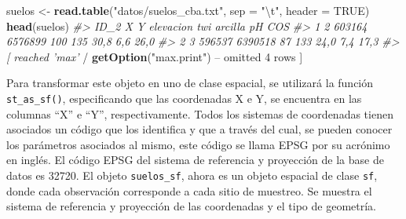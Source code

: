 \documentclass[11pt,b5paper,]{krantz}
\newenvironment{Shaded}{}{}
\newcommand{\KeywordTok}[1]{\textcolor[rgb]{0.00,0.44,0.13}{\textbf{#1}}}
\newcommand{\DataTypeTok}[1]{\textcolor[rgb]{0.56,0.13,0.00}{#1}}
\newcommand{\DecValTok}[1]{\textcolor[rgb]{0.25,0.63,0.44}{#1}}
\newcommand{\CharTok}[1]{\textcolor[rgb]{0.25,0.44,0.63}{#1}}
\newcommand{\StringTok}[1]{\textcolor[rgb]{0.25,0.44,0.63}{#1}}
\newcommand{\CommentTok}[1]{\textcolor[rgb]{0.38,0.63,0.69}{\textit{#1}}}
\newcommand{\OtherTok}[1]{\textcolor[rgb]{0.00,0.44,0.13}{#1}}
\newcommand{\OperatorTok}[1]{\textcolor[rgb]{0.40,0.40,0.40}{#1}}
\newcommand{\NormalTok}[1]{#1}
\begin{document}
\begin{Shaded}
\begin{Highlighting}[]
\NormalTok{suelos <-}\StringTok{ }\KeywordTok{read.table}\NormalTok{(}\StringTok{"datos/suelos_cba.txt"}\NormalTok{, }
                     \DataTypeTok{sep =} \StringTok{"}\CharTok{\textbackslash{}t}\StringTok{"}\NormalTok{, }\DataTypeTok{header =} \OtherTok{TRUE}\NormalTok{)}
\KeywordTok{head}\NormalTok{(suelos)}
\CommentTok{#> ID_2 X Y elevacion twi arcilla pH COS}
\CommentTok{#> 1 2 603164 6576899 100 135 30,8 6,6 26,0}
\CommentTok{#> 2 3 596537 6390518 87 133 24,0 7,4 17,3}
\CommentTok{#> [ reached 'max'}
    \OperatorTok{/}\StringTok{ }\KeywordTok{getOption}\NormalTok{(}\StringTok{"max.print"}\NormalTok{) }\OperatorTok{--}
\NormalTok{omitted }\DecValTok{4}\NormalTok{ rows ]}
\end{Highlighting}
\end{Shaded}

Para transformar este objeto en uno de clase espacial, se utilizará la
función \texttt{st\_as\_sf()}, especificando que las coordenadas X e Y,
se encuentra en las columnas ``X'' e ``Y'', respectivamente. Todos los
sistemas de coordenadas tienen asociados un código que los identifica y
que a través del cual, se pueden conocer los parámetros asociados al
mismo, este código se llama EPSG por su acrónimo en inglés. El código
EPSG del sistema de referencia y proyección de la base de datos es
32720. El objeto \texttt{suelos\_sf}, ahora es un objeto espacial de
clase \texttt{sf}, donde cada observación corresponde a cada sitio de
muestreo. Se muestra el sistema de referencia y proyección de las
coordenadas y el tipo de geometría.
\end{document}
